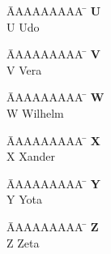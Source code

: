 \vspace*{-1.5cm}
\begin{tabbing}
	\hspace{0.0cm}  \= AAAAAAAAA \=       \hspace{2cm} \kill
	\>\textbf{U} 	\> \\
	\>U 			\>  Udo\\
\end{tabbing}

\vspace*{-1.5cm}
\begin{tabbing}
	\hspace{0.0cm}  \= AAAAAAAAA \=       \hspace{2cm} \kill
	\>\textbf{V} 	\> \\
	\>V 			\>  Vera\\
\end{tabbing}

\vspace*{-1.5cm}
\begin{tabbing}
	\hspace{0.0cm}  \= AAAAAAAAA \=       \hspace{2cm} \kill
	\>\textbf{W} 	\> \\
	\>W 			\>  Wilhelm\\
\end{tabbing}

\vspace*{-1.5cm}
\begin{tabbing}
	\hspace{0.0cm}  \= AAAAAAAAA \=       \hspace{2cm} \kill
	\>\textbf{X} 	\> \\
	\>X 			\>  Xander\\
\end{tabbing}

\vspace*{-1.5cm}
\begin{tabbing}
	\hspace{0.0cm}  \= AAAAAAAAA \=       \hspace{2cm} \kill
	\>\textbf{Y} 	\> \\
	\>Y 			\>  Yota\\
\end{tabbing}

\vspace*{-1.5cm}
\begin{tabbing}
	\hspace{0.0cm}  \= AAAAAAAAA \=       \hspace{2cm} \kill
	\>\textbf{Z} 	\> \\
	\>Z 			\>  Zeta\\
\end{tabbing}  